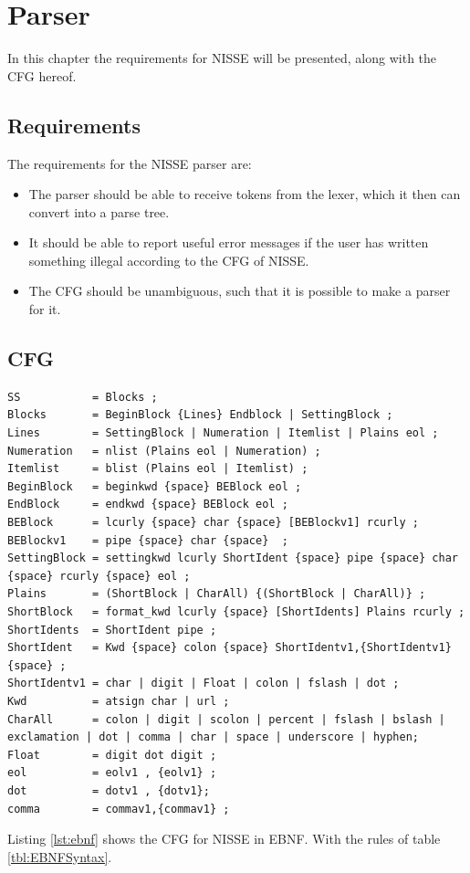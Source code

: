 \chapter{Parser}

In this chapter the requirements for NISSE will be presented, along with the CFG hereof.

\section{Requirements}
The requirements for the NISSE parser are:
\begin{itemize}
	\item The parser should be able to receive tokens from the lexer, which it then can convert into a parse tree.
	\item It should be able to report useful error messages if the user has written something illegal according to the CFG of NISSE.
	\item The CFG should be unambiguous, such that it is possible to make a parser for it. 
\end{itemize}

\newpage
\section{CFG}
\begin{lstlisting}[frame=single, caption={CFG of NISSE in EBNF.}, label={lst:ebnf}, language=NISSE]
SS           = Blocks ;
Blocks       = BeginBlock {Lines} Endblock | SettingBlock ;
Lines        = SettingBlock | Numeration | Itemlist | Plains eol ;
Numeration   = nlist (Plains eol | Numeration) ;
Itemlist     = blist (Plains eol | Itemlist) ;
BeginBlock   = beginkwd {space} BEBlock eol ;
EndBlock     = endkwd {space} BEBlock eol ;
BEBlock      = lcurly {space} char {space} [BEBlockv1] rcurly ;
BEBlockv1    = pipe {space} char {space}  ;
SettingBlock = settingkwd lcurly ShortIdent {space} pipe {space} char {space} rcurly {space} eol ;
Plains       = (ShortBlock | CharAll) {(ShortBlock | CharAll)} ;
ShortBlock   = format_kwd lcurly {space} [ShortIdents] Plains rcurly ;
ShortIdents  = ShortIdent pipe ;
ShortIdent   = Kwd {space} colon {space} ShortIdentv1,{ShortIdentv1} {space} ;
ShortIdentv1 = char | digit | Float | colon | fslash | dot ;
Kwd          = atsign char | url ;
CharAll      = colon | digit | scolon | percent | fslash | bslash | exclamation | dot | comma | char | space | underscore | hyphen;
Float        = digit dot digit ; 
eol          = eolv1 , {eolv1} ;
dot          = dotv1 , {dotv1};
comma        = commav1,{commav1} ;
\end{lstlisting}
Listing \ref{lst:ebnf} shows the CFG for NISSE in EBNF. With the rules of table \ref{tbl:EBNFSyntax}.

